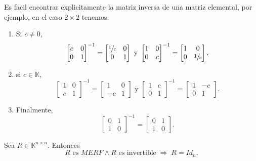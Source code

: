 \documentclass{article}
\theoremstyle{definition}
\theoremstyle{definition}
\theoremstyle{remark}
\begin{document}
Es facil encontrar explicitamente la matriz inversa de una matriz elemental, por ejemplo, en el caso $2 \times 2$ tenemos: \begin{enumerate}[label=\textcolor{azulp2}{\arabic*.}]
  \item Si $ c \neq 0$, \[
      \begin{bmatrix}c & 0 \\ 0 & 1 \end{bmatrix}^{-1}=\begin{bmatrix}\sfrac{1}{c} & 0 \\ 0 & 1 \end{bmatrix} \text{ y } \begin{bmatrix}1 & 0 \\ 0 & c \end{bmatrix}^{-1}=\begin{bmatrix}1 & 0 \\ 0 & \sfrac{1}{c}\end{bmatrix},
    \] 
  \item si $c \in \mathbb{K}$, \[
      \begin{bmatrix} 1 & 0 \\ c & 1 \end{bmatrix}^{-1}=\begin{bmatrix}1 & 0 \\ -c & 1 \end{bmatrix} \text{ y } \begin{bmatrix}1 & c \\ 0 & 1 \end{bmatrix}^{-1}=\begin{bmatrix}1 & -c \\ 0 & 1 \end{bmatrix}.
    \]
  \item  Finalmente, \[
      \begin{bmatrix}0 & 1 \\ 1 & 0 \end{bmatrix}^{-1}=\begin{bmatrix}0 & 1 \\ 1 & 0 \end{bmatrix}.
    \]
 \end{enumerate}
\begin{lema}
  Sea $R \in \mathbb{K}^{n \times n}$. Entonces \[
    R \text{ es } MERF \land R \text{ es invertible} \; \Rightarrow \; R = Id_n.
  \]
\end{lema}
\end{document}
